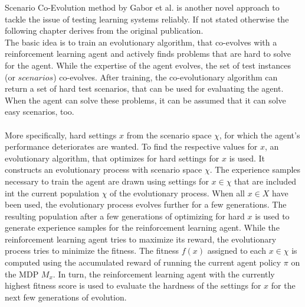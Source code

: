 Scenario Co-Evolution method by Gabor et al. \cite{gabor19} is another novel approach to tackle the issue of testing learning systems reliably. If not stated otherwise the following chapter derives from the original publication.\\
The basic idea is to train an evolutionary algorithm, that co-evolves with a reinforcement learning agent and actively finds problems that are hard to solve for the agent. While the expertise of the agent evolves, the set of test instances (or $scenarios$) co-evolves. After training, the co-evolutionary algorithm can return a set of hard test scenarios, that can be used for evaluating the agent. When the agent can solve these problems, it can be assumed that it can solve easy scenarios, too.\\\\
More specifically, hard settings $x$ from the scenario space $\chi$, for which the agent's performance deteriorates are wanted. To find the respective values for $x$, an evolutionary algorithm, that optimizes for hard settings for $x$ is used. It constructs an evolutionary process with  scenario space $\chi$. The experience samples necessary to train the agent are drawn using settings for $x \in \chi$ that are included int the current population $\chi$ of the evolutionary process. When all $x \in X$ have been used, the evolutionary process evolves further for a few generations. The resulting population after a few generations of optimizing for hard $x$ is used to generate experience samples for the reinforcement learning agent. While the reinforcement learning agent tries to maximize its reward, the evolutionary process tries to minimize the fitness. The fitness $f(x)$ assigned to each $x \in \chi$ is computed using the accumulated reward of running the current agent policy $\pi$ on the MDP $M_x$. %
In turn, the reinforcement learning agent with the currently highest fitness score is used to evaluate the hardness of the settings for $x$ for the next few generations of evolution. 